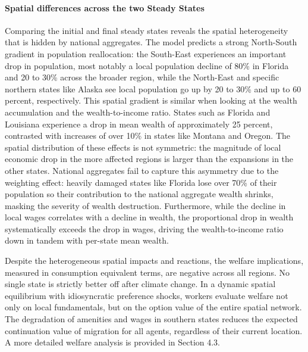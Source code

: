 \documentclass[12pt, a4paper]{article}
\begin{document}
\paragraph{Spatial differences across the two Steady States}

Comparing the initial and final steady states reveals the spatial heterogeneity that is hidden by national aggregates. The model predicts a strong North-South gradient in population reallocation: the South-East experiences an important drop in population, most notably a local population decline of 80\% in Florida and 20 to 30\% across the broader region, while the North-East and specific northern states like Alaska see local population go up by 20 to 30\% and up to 60 percent, respectively. 
This spatial gradient is similar when looking at the wealth accumulation and the wealth-to-income ratio. States such as Florida and Louisiana experience a drop in mean wealth of approximately 25 percent, contrasted with increases of over 10\% in states like Montana and Oregon. The spatial distribution of these effects is not symmetric: the magnitude of local economic drop in the more affected regions is larger than the expansions in the other states. National aggregates fail to capture this asymmetry due to the weighting effect: heavily damaged states like Florida lose over 70\% of their population so their contribution to the national aggregate wealth shrinks, masking the severity of wealth destruction. Furthermore, while the decline in local wages correlates with a decline in wealth, the proportional drop in wealth systematically exceeds the drop in wages, driving the wealth-to-income ratio down in tandem with per-state mean wealth. 

Despite the heterogeneous spatial impacts and reactions, the welfare implications, measured in consumption equivalent terms, are negative across all regions. No single state is strictly better off after climate change. In a dynamic spatial equilibrium with idiosyncratic preference shocks, workers evaluate welfare not only on local fundamentals, but on the option value of the entire spatial network. The degradation of amenities and wages in southern states reduces the expected continuation value of migration for all agents, regardless of their current location. A more detailed welfare analysis is provided in Section 4.3.
\end{document}
